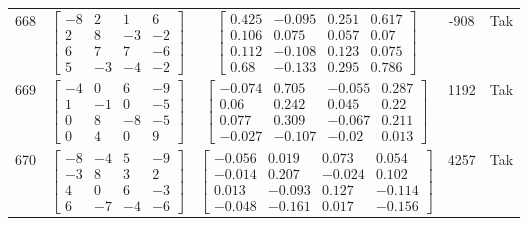 \documentclass[a4paper,12pt]{article}
\begin{document}
\begin{tabular}{c c c c c}
668
&
$\begin{bmatrix} -8 & 2 & 1 & 6 \\ 2 & 8 & -3 & -2 \\ 6 & 7 & 7 & -6 \\ 5 & -3 & -4 & -2 \end{bmatrix}$
&
$\begin{bmatrix} 0.425 & -0.095 & 0.251 & 0.617 \\ 0.106 & 0.075 & 0.057 & 0.07 \\ 0.112 & -0.108 & 0.123 & 0.075 \\ 0.68 & -0.133 & 0.295 & 0.786 \end{bmatrix}$
&
-908
&
Tak
\\
669
&
$\begin{bmatrix} -4 & 0 & 6 & -9 \\ 1 & -1 & 0 & -5 \\ 0 & 8 & -8 & -5 \\ 0 & 4 & 0 & 9 \end{bmatrix}$
&
$\begin{bmatrix} -0.074 & 0.705 & -0.055 & 0.287 \\ 0.06 & 0.242 & 0.045 & 0.22 \\ 0.077 & 0.309 & -0.067 & 0.211 \\ -0.027 & -0.107 & -0.02 & 0.013 \end{bmatrix}$
&
1192
&
Tak
\\
670
&
$\begin{bmatrix} -8 & -4 & 5 & -9 \\ -3 & 8 & 3 & 2 \\ 4 & 0 & 6 & -3 \\ 6 & -7 & -4 & -6 \end{bmatrix}$
&
$\begin{bmatrix} -0.056 & 0.019 & 0.073 & 0.054 \\ -0.014 & 0.207 & -0.024 & 0.102 \\ 0.013 & -0.093 & 0.127 & -0.114 \\ -0.048 & -0.161 & 0.017 & -0.156 \end{bmatrix}$
&
4257
&
Tak
\\
\end{tabular} \egroup \newpage
\end{document}
